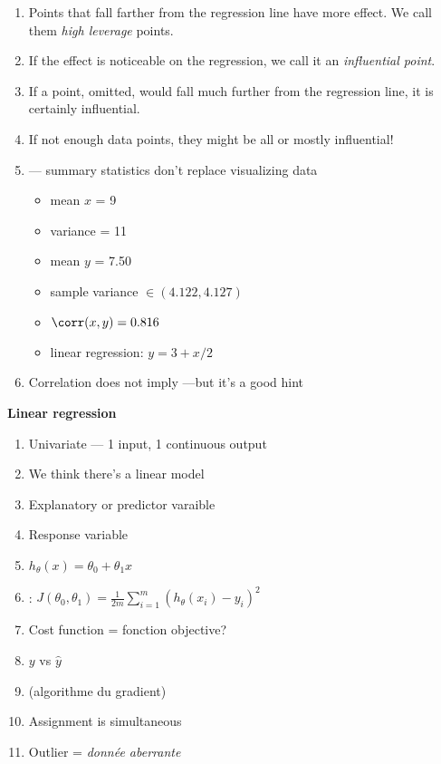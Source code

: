 \begin{enumerate}
\item Points that fall farther from the regression line have more
  effect.  We call them \textit{high leverage} points.
\item If the effect is noticeable on the regression, we call it an
  \textit{influential point}.
\item If a point, omitted, would fall much further from the regression
  line, it is certainly influential.
\item If not enough data points, they might be all or mostly
  influential!
\item {} --- summary statistics don't replace visualizing data
  \begin{itemize}
  \item mean $x$ = 9
  \item variance = 11
  \item mean $y$ = 7.50
  \item sample variance $\in (4.122, 4.127)$
  \item $\corr(x,y) = 0.816$
  \item linear regression: $y=3 + x/2$
  \end{itemize}
\item Correlation does not imply ---but it's a good hint
\end{enumerate}


\textbf{Linear regression}
\begin{enumerate}
\item Univariate --- 1 input, 1 continuous output
\item We think there's a linear model
\item Explanatory or predictor varaible
\item Response variable
\item $h_\theta(x) = \theta_0 + \theta_1 x$
\item {} : $J(\theta_0, \theta_1) = \frac{1}{2m} \sum_{i=1}^m (h_\theta(x_i) - y_i)^2$
\item Cost function = fonction objective?
\item $y$ vs $\hat{y}$
\item {} (algorithme du gradient)
\item Assignment is simultaneous
\item Outlier = \textit{donnée aberrante}
\end{enumerate}

